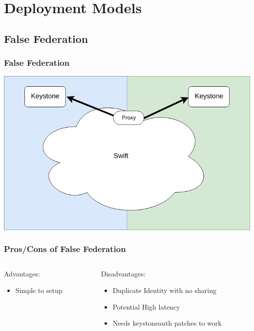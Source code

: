 \documentclass[aspectratio=169,11pt,hyperref={colorlinks=true}]{beamer}
\begin{document}
\section{Deployment Models}

\subsection{False Federation}
\begin{frame}
\frametitle{False Federation}
\centering
\includegraphics[width=.775\textwidth]{swift-federation-false.png}
\end{frame}

\begin{frame}
\frametitle{Pros/Cons of False Federation}
\begin{columns}[T]
    \begin{column}{.48\textwidth}
        Advantages:
        \begin{itemize}
            \item Simple to setup
        \end{itemize}
    \end{column}
    \begin{column}{.48\textwidth}
        Disadvantages:
        \begin{itemize}
            \item Duplicate Identity with no sharing
            \item Potential High latency
            \item Needs keystoneauth patches to work
        \end{itemize}
    \end{column}
\end{columns}
\end{frame}
\end{document}

